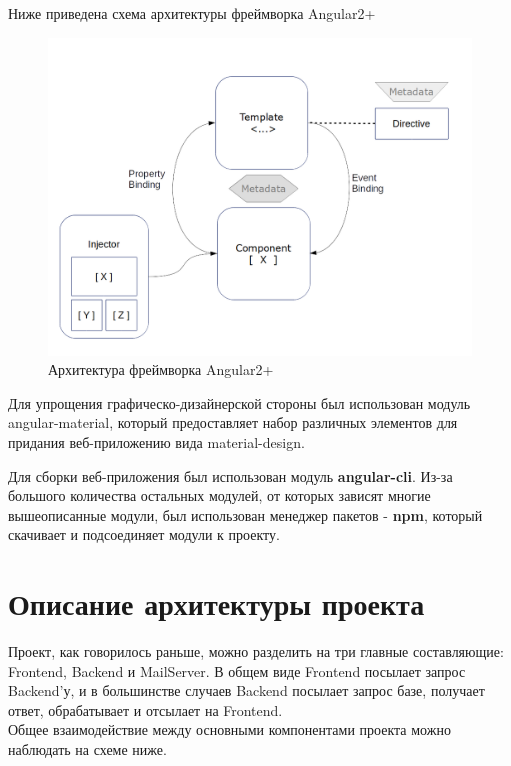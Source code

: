 \documentclass{article}
\begin{document}
Ниже приведена схема архитектуры фреймворка Angular2+
\begin{figure}[H]
        \begin{flushleft}        \centerline{\includegraphics[scale=0.45]{angulararch.png}}
        \caption{Архитектура фреймворка Angular2+}
        \end{flushleft}
\end{figure}

Для упрощения графическо-дизайнерской стороны был использован модуль angular-material, который предоставляет набор различных элементов для придания веб-приложению вида material-design. 

Для сборки веб-приложения был использован модуль \textbf{angular-cli}.
Из-за большого количества остальных модулей, от которых зависят многие вышеописанные модули, был использован менеджер пакетов - \textbf{npm}, который скачивает и подсоединяет модули к проекту.

\section{Описание архитектуры проекта}
Проект, как говорилось раньше, можно разделить на три главные составляющие: Frontend, Backend и MailServer. В общем виде Frontend посылает запрос Backend'у, и в большинстве случаев Backend посылает запрос базе, получает ответ, обрабатывает и отсылает на Frontend. \\
Общее взаимодействие между основными компонентами проекта можно наблюдать на схеме ниже. 
\end{document}

